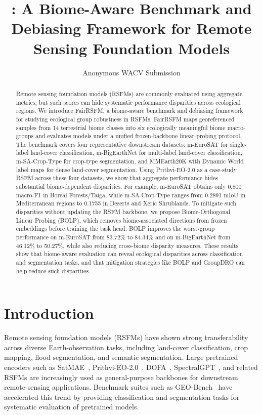 \documentclass[10pt,twocolumn,letterpaper]{article}
\title{\method: A Biome-Aware Benchmark and Debiasing Framework for Remote Sensing Foundation Models}
\author{Anonymous WACV Submission}
\newcommand{\method}{FairRSFM\xspace}
\begin{document}
\maketitle

\begin{abstract}
Remote sensing foundation models (RSFMs) are commonly evaluated using aggregate metrics, but such scores can hide systematic performance disparities across ecological regions. We introduce \method, a biome-aware benchmark and debiasing framework for studying ecological group robustness in RSFMs. \method maps georeferenced samples from 14 terrestrial biome classes into six ecologically meaningful biome macro-groups and evaluates models under a unified frozen-backbone linear-probing protocol. The benchmark covers four representative downstream datasets: m-EuroSAT for single-label land-cover classification, m-BigEarthNet for multi-label land-cover classification, m-SA-Crop-Type for crop-type segmentation, and MMEarth20K with Dynamic World label maps for dense land-cover segmentation. Using Prithvi-EO-2.0 as a case-study RSFM across these four datasets, we show that aggregate performance hides substantial biome-dependent disparities. For example, m-EuroSAT obtains only 0.800 macro-F1 in Boreal Forests/Taiga, while m-SA-Crop-Type ranges from 0.2891 mIoU in Mediterranean regions to 0.1755 in Deserts and Xeric Shrublands. To mitigate such disparities without updating the RSFM backbone, we propose Biome-Orthogonal Linear Probing (BOLP), which removes biome-associated directions from frozen embeddings before training the task head. BOLP improves the worst-group performance on m-EuroSAT from 83.72\% to 84.34\% and on m-BigEarthNet from 46.12\% to 50.27\%, while also reducing cross-biome disparity measures. These results show that biome-aware evaluation can reveal ecological disparities across classification and segmentation tasks, and that mitigation strategies like BOLP and GroupDRO can help reduce such disparities.

\end{abstract}



\section{Introduction}

Remote sensing foundation models (RSFMs) have shown strong transferability across diverse Earth-observation tasks, including land-cover classification, crop mapping, flood segmentation, and semantic segmentation. Large pretrained encoders such as SatMAE~\cite{satmae}, Prithvi-EO-2.0~\cite{prithvi2}, DOFA~\cite{dofa}, SpectralGPT~\cite{spectralgpt}, and related RSFMs are increasingly used as general-purpose backbones for downstream remote-sensing applications. Benchmark suites such as GEO-Bench~\cite{geobench} have accelerated this trend by providing classification and segmentation tasks for systematic evaluation of pretrained models.
\end{document}
